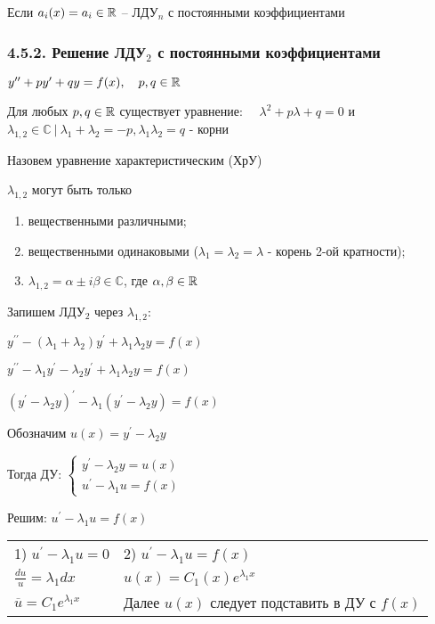 \documentclass[12pt]{article}
\begin{document}
    \Notas Если $a_i(x) = a_i \in \mathbb{R}$ -- ЛДУ$_n$ с постоянными коэффициентами

    \hypertarget{lineardifferentialequationseconddegreewithconstants}{}

    \subsubsection{4.5.2. Решение ЛДУ$_2$ с постоянными коэффициентами}

    $y^{\prime\prime} + p y^\prime + q y = f(x), \quad p, q \in \mathbb{R}$

    Для любых $p, q \in \mathbb{R}$ существует уравнение: $\quad \lambda^2 + p\lambda + q = 0$ и $\lambda_{1,2} \in \mathbb{C} \ | \ \lambda_1 + \lambda_2 = -p, \lambda_1 \lambda_2 = q$ - корни

    Назовем уравнение характеристическим (ХрУ) \Cat

    \Nota $\lambda_{1, 2}$ могут быть только

    \begin{enumerate}
        \item вещественными различными;

        \item вещественными одинаковыми ($\lambda_1 = \lambda_2 = \lambda$ - корень 2-ой кратности);

        \item $\lambda_{1,2} = \alpha \pm i \beta \in \mathbb{C}$, где $\alpha, \beta \in \mathbb{R}$
    \end{enumerate}

    Запишем ЛДУ$_2$ через $\lambda_{1, 2}$:

    $y^{\prime\prime} - (\lambda_1 + \lambda_2) y^\prime + \lambda_1 \lambda_2 y = f(x)$

    $y^{\prime\prime} - \lambda_1 y^\prime - \lambda_2 y^\prime + \lambda_1 \lambda_2 y = f(x)$

    $(y^\prime - \lambda_2 y)^\prime - \lambda_1 (y^\prime - \lambda_2 y) = f(x)$

    Обозначим $u(x) = y^\prime - \lambda_2 y$

    Тогда ДУ: $\begin{cases}
                   y^\prime - \lambda_2 y = u(x) \\ u^\prime - \lambda_1 u = f(x)
    \end{cases}$

    Решим: $u^\prime - \lambda_1 u = f(x)$

    \begin{tabular}{p{5cm}p{10cm}}
        1) $u^\prime - \lambda_1 u = 0$      & 2) $u^\prime - \lambda_1 u = f(x)$            \\

        $\frac{du}{u} = \lambda_1 dx$        & $u(x) = C_1(x)e^{\lambda_1 x}$                \\

        $\overline{u} = C_1 e^{\lambda_1 x}$ & Далее $u(x)$ следует подставить в ДУ с $f(x)$ \\
    \end{tabular}
\end{document}

